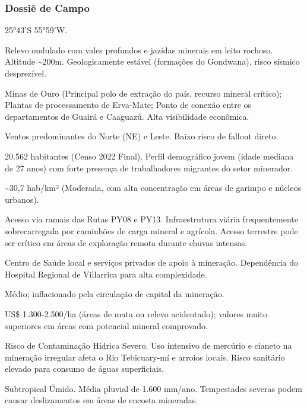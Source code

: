 \subsubsection{Dossiê de Campo}
\begin{description}[style=nextline,leftmargin=0.5cm,font=\bfseries]
\item[Coordenadas]  25°43'S 55°59'W.
\item[Topografia]  Relevo ondulado com vales profundos e jazidas minerais em leito rochoso. Altitude \textasciitilde 200m. Geologicamente estável (formações do Gondwana), risco sísmico desprezível.
\item[Alvos Estratégicos]  Minas de Ouro (Principal polo de extração do país, recurso mineral crítico); Plantas de processamento de Erva-Mate; Ponto de conexão entre os departamentos de Guairá e Caaguazú. Alta visibilidade econômica.
\item[Fallout]  Ventos predominantes do Norte (NE) e Leste. Baixo risco de fallout direto.
\item[População]  20.562 habitantes (Censo 2022 Final). Perfil demográfico jovem (idade mediana de 27 anos) com forte presença de trabalhadores migrantes do setor minerador.
\item[Densidade]  \textasciitilde 30,7 hab/\allowbreak km² (Moderada, com alta concentração em áreas de garimpo e núcleos urbanos).
\item[Vias de Acesso]  Acesso via ramais das Rutas PY08 e PY13. Infraestrutura viária frequentemente sobrecarregada por caminhões de carga mineral e agrícola. Acesso terrestre pode ser crítico em áreas de exploração remota durante chuvas intensas.
\item[Serviços]  Centro de Saúde local e serviços privados de apoio à mineração. Dependência do Hospital Regional de Villarrica para alta complexidade.
\item[Custo de Vida]  Médio; inflacionado pela circulação de capital da mineração.
\item[Preço da Terra]  US\$ 1.300-2.500/\allowbreak ha (áreas de mata ou relevo acidentado); valores muito superiores em áreas com potencial mineral comprovado.
\item[Hidrologia]  Risco de Contaminação Hídrica Severo. Uso intensivo de mercúrio e cianeto na mineração irregular afeta o Rio Tebicuary-mí e arroios locais. Risco sanitário elevado para consumo de águas superficiais.
\item[Clima]  Subtropical Úmido. Média pluvial de 1.600 mm/\allowbreak ano. Tempestades severas podem causar deslizamentos em áreas de encosta mineradas.

\end{description}
